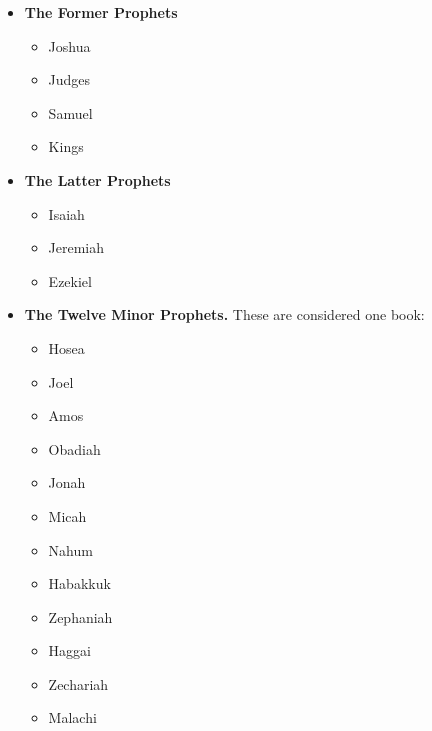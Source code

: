 \documentclass[std]{jbible}
\begin{document}
\begin{itemize}
  \item \textbf{The Former Prophets}
  \begin{itemize}
    \item Joshua
    \item Judges
    \item Samuel
    \item Kings
  \end{itemize}
  
  \item \textbf{The Latter Prophets}
  \begin{itemize}
    \item Isaiah
    \item Jeremiah
    \item Ezekiel
  \end{itemize}
  
  \item \textbf{The Twelve Minor Prophets.} These are considered one book:
  \begin{itemize}
    \item Hosea
    \item Joel
    \item Amos
    \item Obadiah
    \item Jonah
    \item Micah
    \item Nahum
    \item Habakkuk
    \item Zephaniah
    \item Haggai
    \item Zechariah
    \item Malachi
  \end{itemize}
\end{itemize}
























\end{document}
